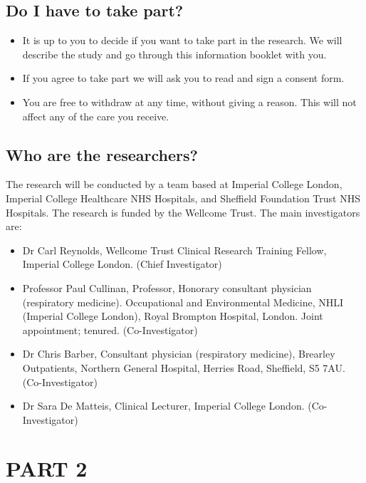 \documentclass[a4paper,10pt]{article}
\begin{document}
\subsection*{Do I have to take part?}
\begin{itemize}
 \item It is up to you to decide if you want to take part in the research. We will describe the study and go through this information booklet with you.
 \item If you agree to take part we will ask you to read and sign a consent form.
 \item You are free to withdraw at any time, without giving a reason. This will not affect any of the care you receive.
\end{itemize}

 
\subsection*{Who are the researchers?}
The research will be conducted by a team based at Imperial College London, Imperial College Healthcare NHS Hospitals, and Sheffield Foundation Trust NHS Hospitals. The research is funded by the Wellcome Trust. The main investigators are:
\begin{itemize}
 \item Dr Carl Reynolds, Wellcome Trust Clinical Research Training Fellow, Imperial College London. (Chief Investigator)
 \item Professor Paul Cullinan, Professor, Honorary consultant physician (respiratory medicine). Occupational and Environmental Medicine, NHLI (Imperial College London), Royal Brompton Hospital, London.
Joint appointment; tenured. (Co-Investigator)
 \item Dr Chris Barber, Consultant physician (respiratory medicine), Brearley Outpatients, Northern General Hospital, Herries Road, Sheffield, S5 7AU. (Co-Investigator)
 \item Dr Sara De Matteis, Clinical Lecturer, Imperial College London. (Co-Investigator)
\end{itemize}

\section*{PART 2}
\end{document}
